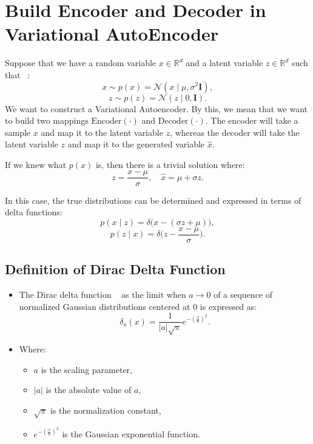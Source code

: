 \section{Build Encoder and Decoder in Variational AutoEncoder}

Suppose that we have a random variable $x \in \mathbb{R}^d$ and a latent variable $z \in \mathbb{R}^d$ such that ~\cite{cemgil2020autoencoding}:
\[
x \sim p(x) = \mathcal{N}(x \mid \mu, \sigma^2 \mathbf{I}),
\]
\[
z \sim p(z) = \mathcal{N}(z \mid 0, \mathbf{I}).
\]
We want to construct a Variational Autoencoder. By this, we mean that we want to build two mappings $\text{Encoder}(\cdot)$ and $\text{Decoder}(\cdot)$. The encoder will take a sample $x$ and map it to the latent variable $z$, whereas the decoder will take the latent variable $z$ and map it to the generated variable $\hat{x}$. 

If we knew what $p(x)$ is, then there is a trivial solution where:
\[
z = \frac{x - \mu}{\sigma}, \quad \hat{x} = \mu + \sigma z.
\]

In this case, the true distributions can be determined and expressed in terms of delta functions:
\[
p(x \mid z) = \delta \big(x - (\sigma z + \mu)\big),
\]
\[
p(z \mid x) = \delta \big(z - \frac{x - \mu}{\sigma}\big).
\]

\subsection{Definition of Dirac Delta Function}
\begin{itemize}
    \item The Dirac delta function  ~\cite{wheeler1997dirac} as the limit when $a \to 0$ of a sequence of normalized Gaussian distributions centered at 0 is expressed as:
    \[
    \delta_a(x) = \frac{1}{|a| \sqrt{\pi}} e^{-\left(\frac{x}{a}\right)^2}.
    \]
    \item Where:
    \begin{itemize}
        \item $a$ is the scaling parameter,
        \item $|a|$ is the absolute value of $a$,
        \item $\sqrt{\pi}$ is the normalization constant,
        \item $e^{-\left(\frac{x}{a}\right)^2}$ is the Gaussian exponential function.
    \end{itemize}
\end{itemize}

